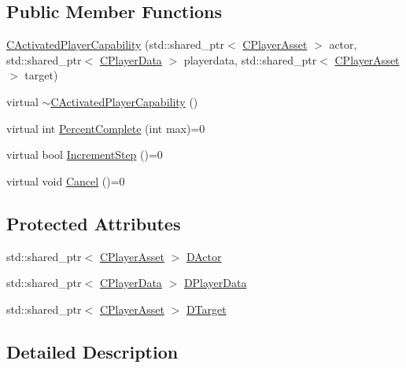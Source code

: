\subsection*{Public Member Functions}
\begin{DoxyCompactItemize}
\item 
\hyperlink{classCActivatedPlayerCapability_a1ece00ffb6a7b925c84dd94a7407a0d1}{C\+Activated\+Player\+Capability} (std\+::shared\+\_\+ptr$<$ \hyperlink{classCPlayerAsset}{C\+Player\+Asset} $>$ actor, std\+::shared\+\_\+ptr$<$ \hyperlink{classCPlayerData}{C\+Player\+Data} $>$ playerdata, std\+::shared\+\_\+ptr$<$ \hyperlink{classCPlayerAsset}{C\+Player\+Asset} $>$ target)
\item 
virtual \hyperlink{classCActivatedPlayerCapability_a75845fda9554fb75644aae5a6c5f0084}{$\sim$\+C\+Activated\+Player\+Capability} ()
\item 
virtual int \hyperlink{classCActivatedPlayerCapability_a405dc6076058006a4f801727de4cfe4d}{Percent\+Complete} (int max)=0
\item 
virtual bool \hyperlink{classCActivatedPlayerCapability_a943b5999a57504399293250382c0ec6a}{Increment\+Step} ()=0
\item 
virtual void \hyperlink{classCActivatedPlayerCapability_a5cde83be468e262ad054d81e28684a81}{Cancel} ()=0
\end{DoxyCompactItemize}
\subsection*{Protected Attributes}
\begin{DoxyCompactItemize}
\item 
std\+::shared\+\_\+ptr$<$ \hyperlink{classCPlayerAsset}{C\+Player\+Asset} $>$ \hyperlink{classCActivatedPlayerCapability_a54ca944b47bff2718330639941d402b0}{D\+Actor}
\item 
std\+::shared\+\_\+ptr$<$ \hyperlink{classCPlayerData}{C\+Player\+Data} $>$ \hyperlink{classCActivatedPlayerCapability_a9bf27c322a73f4b11c8183cc1973c3d8}{D\+Player\+Data}
\item 
std\+::shared\+\_\+ptr$<$ \hyperlink{classCPlayerAsset}{C\+Player\+Asset} $>$ \hyperlink{classCActivatedPlayerCapability_a8a1cf50b6501bcfd55af0c935828e395}{D\+Target}
\end{DoxyCompactItemize}


\subsection{Detailed Description}


